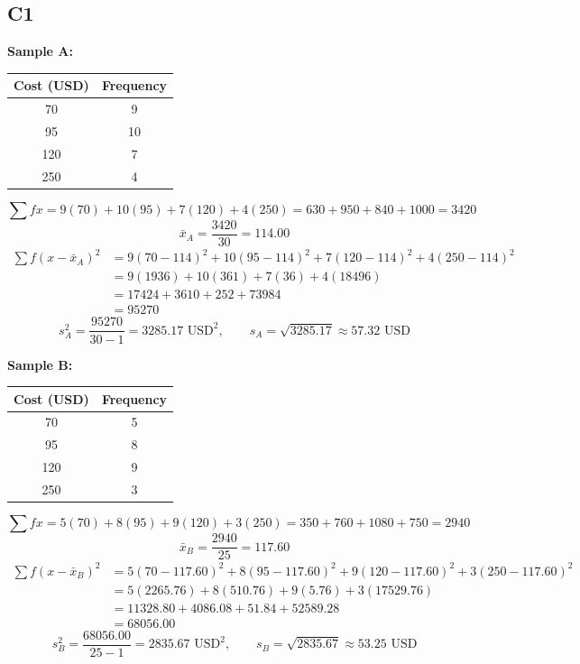 \begin{ExamProblems}
		\subsection*{C1}
		\textbf{Sample A:}
		\begin{center}
			\begin{tabular}{c c}
				\toprule
				Cost (USD) & Frequency \\
				\midrule
				70 & 9 \\
				95 & 10 \\
				120 & 7 \\
				250 & 4 \\
				\bottomrule
			\end{tabular}
		\end{center}
		\[
		\sum f x = 9(70) + 10(95) + 7(120) + 4(250)
		= 630 + 950 + 840 + 1000
		= 3420
		\]
		\[
		\bar{x}_A = \frac{3420}{30} = 114.00
		\]
		\[
		\begin{aligned}
			\sum f(x-\bar{x}_A)^2 &= 9(70-114)^2 + 10(95-114)^2 + 7(120-114)^2 + 4(250-114)^2 \\
			&= 9(1936) + 10(361) + 7(36) + 4(18496) \\
			&= 17424 + 3610 + 252 + 73984 \\
			&= 95270
		\end{aligned}
		\]
		\[
		s_A^2 = \frac{95270}{30-1} = 3285.17 \text{ USD}^2, \qquad s_A = \sqrt{3285.17} \approx 57.32 \text{ USD}
		\]
		
		\textbf{Sample B:}
		\begin{center}
			\begin{tabular}{c c}
				\toprule
				Cost (USD) & Frequency \\
				\midrule
				70 & 5 \\
				95 & 8 \\
				120 & 9 \\
				250 & 3 \\
				\bottomrule
			\end{tabular}
		\end{center}
		\[
		\sum f x = 5(70) + 8(95) + 9(120) + 3(250)
		= 350 + 760 + 1080 + 750
		= 2940
		\]
		\[
		\bar{x}_B = \frac{2940}{25} = 117.60
		\]
		\[
		\begin{aligned}
			\sum f(x-\bar{x}_B)^2 &= 5(70-117.60)^2 + 8(95-117.60)^2 + 9(120-117.60)^2 + 3(250-117.60)^2 \\
			&= 5(2265.76) + 8(510.76) + 9(5.76) + 3(17529.76) \\
			&= 11328.80 + 4086.08 + 51.84 + 52589.28 \\
			&= 68056.00
		\end{aligned}
		\]
		\[
		s_B^2 = \frac{68056.00}{25-1} = 2835.67 \text{ USD}^2, \qquad s_B = \sqrt{2835.67} \approx 53.25 \text{ USD}
		\]
		

\end{ExamProblems}
